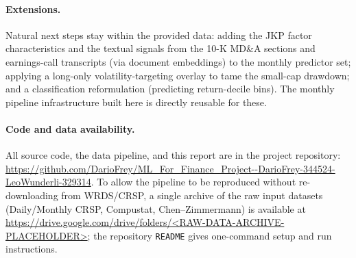 \documentclass[11pt,a4paper]{article}
\begin{document}
\paragraph{Extensions.}
Natural next steps stay within the provided data: adding the JKP factor
characteristics and the textual signals from the 10-K MD\&A sections and
earnings-call transcripts (via document embeddings) to the monthly predictor
set; applying a long-only volatility-targeting overlay to tame the small-cap
drawdown; and a classification reformulation (predicting return-decile bins).
The monthly pipeline infrastructure built here is directly reusable for these.

\paragraph{Code and data availability.}
All source code, the data pipeline, and this report are in the project
repository:\\
\url{https://github.com/DarioFrey/ML_For_Finance_Project--DarioFrey-344524-LeoWunderli-329314}.
To allow the pipeline to be reproduced without re-downloading from
WRDS/CRSP, a single archive of the raw input datasets (Daily/Monthly CRSP,
Compustat, Chen--Zimmermann) is available at
\url{https://drive.google.com/drive/folders/<RAW-DATA-ARCHIVE-PLACEHOLDER>};
the repository \texttt{README} gives one-command setup and run instructions.



\end{document}
